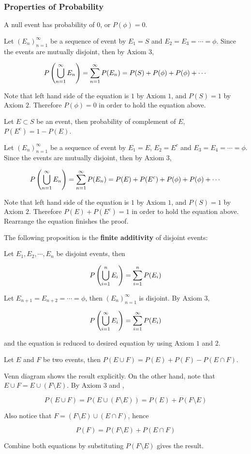 \documentclass[a4paper,12pt]{article}
\begin{document}
\subsubsection{Properties of Probability}
\begin{pst}
  A null event has probability of $0$, or $P(\phi)=0$.\n

  \prf Let $(E_{n})_{n=1}^{\infty}$ be a sequence of event by $E_{1}=S$ and $E_{2}=E_{3}=\cdots=\phi$. Since the events are mutually disjoint, then by Axiom $3$,

  $$P\left( \bigcup_{n=1}^{\infty}E_{n}\right)=\sum_{n=1}^{\infty}P(E_{n})=P(S)+P(\phi)+P(\phi)+\cdots$$\s

  Note that left hand side of the equation is $1$ by Axiom $1$, and $P(S)=1$ by Axiom $2$. Therefore $P(\phi)=0$ in order to hold the equation above.
\end{pst}\n

\begin{pst}
  Let $E\subset S$ be an event, then probability of complement of $E$, $P(E^{c})=1-P(E)$.\n

  \prf Let $(E_{n})_{n=1}^{\infty}$ be a sequence of event by $E_{1}=E$, $E_{2}=E^{c}$ and $E_{3}=E_{4}=\cdots=\phi$. Since the events are mutually disjoint, then by Axiom $3$,

  $$P\left( \bigcup_{n=1}^{\infty}E_{n}\right)=\sum_{n=1}^{\infty}P(E_{n})=P(E)+P(E^{c})+P(\phi)+P(\phi)+\cdots$$\s

  Note that left hand side of the equation is $1$ by Axiom $1$, and $P(S)=1$ by Axiom $2$. Therefore $P(E)+P(E^{c})=1$ in order to hold the equation above. Rearrange the equation finishes the proof.
\end{pst}\n

The following proposition is the \textbf{finite additivity} of disjoint events:\n

\begin{pst}
  Let $E_{1},E_{2},\cdots,E_{n}$ be disjoint events, then

  $$P\left( \bigcup_{i=1}^{n}E_{i}\right)=\sum_{i=1}^{n}P(E_{i})$$\s

  \prf Let $E_{n+1}=E_{n+2}=\cdots=\phi$, then $(E_{n})_{n=1}^{\infty}$ is disjoint. By Axiom $3$,

  $$P\left( \bigcup_{i=1}^{\infty}E_{i}\right)=\sum_{i=1}^{\infty}P(E_{i})$$\s

  and the equation is reduced to desired equation by using Axiom $1$ and $2$. 
\end{pst}\n

\begin{pst}
  Let $E$ and $F$ be two events, then $P(E\cup F)=P(E)+P(F)-P(E\cap F)$.\n

  \prf Venn diagram shows the result explicitly. On the other hand, note that $E\cup F=E\cup(F\setminus E)$. By Axiom $3$ and \rpst[\sctr{1}],
  
  $$P(E\cup F)=P(E\cup(F\setminus E))=P(E)+P(F\setminus E)$$\s

  Also notice that $F=(F\setminus E)\cup(E\cap F)$, hence

  $$P(F)=P(F\setminus E)+P(E\cap F)$$\s

  Combine both equations by substituting $P(F\setminus E)$ gives the result.
\end{pst}\n
\end{document}
